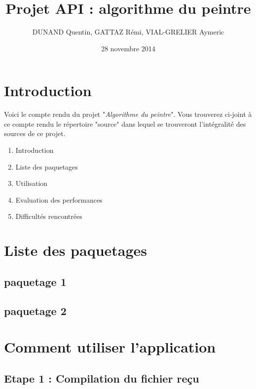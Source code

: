 \documentclass[a4paper]{article}
\title{Projet API : algorithme du peintre}
\author{DUNAND Quentin, GATTAZ Rémi, VIAL-GRELIER Aymeric}
\date{28 novembre 2014}
\begin{document}
\maketitle

\section{Introduction}

Voici le compte rendu du projet "\textit{Algorithme du peintre}". 
Vous trouverez ci-joint à ce compte rendu le répertoire "source" dans lequel se trouveront l'intégralité des sources de ce projet.
\begin{enumerate}
\item Introduction
\item Liste des paquetages
\item Utilisation
\item Evaluation des performances
\item Difficultés rencontrées
\end{enumerate}


\section{Liste des paquetages}
\label{sec:examples}

\subsection{paquetage 1}


\subsection{paquetage 2}


\section{Comment utiliser l'application}
\subsection{Etape 1 : Compilation du fichier reçu}
\end{document}
